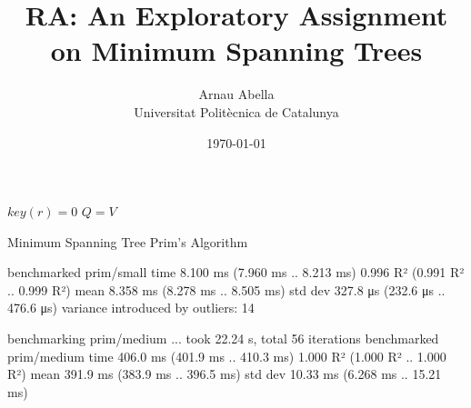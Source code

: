 \documentclass[12pt, a4paper]{article}
\title{%
  \vspace{-10ex}
  RA: An Exploratory Assignment on Minimum Spanning Trees
}
\author{%
  Arnau Abella \\
  \large{Universitat Polit\`ecnica de Catalunya}
}
\date{\today}
\begin{document}
\maketitle


\vspace{5ex}



\begin{algorithm}[H]
  \SetAlgoLined
  \DontPrintSemicolon
  $key(r) = 0$ 
  $Q = V$\;

  \caption{Minimum Spanning Tree Prim's Algorithm}
\end{algorithm}


benchmarked prim/small
time                 8.100 ms   (7.960 ms .. 8.213 ms)
                     0.996 R²   (0.991 R² .. 0.999 R²)
mean                 8.358 ms   (8.278 ms .. 8.505 ms)
std dev              327.8 μs   (232.6 μs .. 476.6 μs)
variance introduced by outliers: 14%

benchmarking prim/medium ... took 22.24 s, total 56 iterations
benchmarked prim/medium
time                 406.0 ms   (401.9 ms .. 410.3 ms)
                     1.000 R²   (1.000 R² .. 1.000 R²)
mean                 391.9 ms   (383.9 ms .. 396.5 ms)
std dev              10.33 ms   (6.268 ms .. 15.21 ms)
\end{document}
